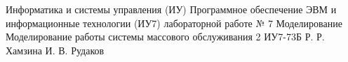 \documentclass{bmstu}
\begin{document}
\makereporttitle
	{Информатика и системы управления (ИУ)}
	{Программное обеспечение ЭВМ и информационные технологии (ИУ7)}
	{лабораторной работе № 7}
	{Моделирование}
	{Моделирование работы системы массового обслуживания}
	{2}
	{ИУ7-73Б}
	{Р. Р. Хамзина}
	{И. В. Рудаков}

\maketableofcontents


\end{document}

